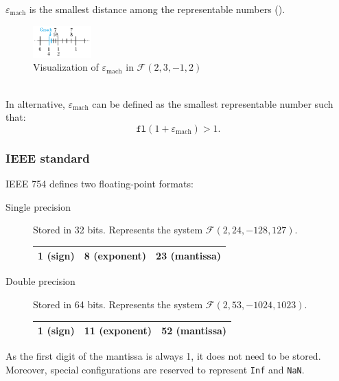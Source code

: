 $\varepsilon_{\text{mach}}$ is the smallest distance among the representable numbers ().
\begin{figure}[h]
    \centering
    \includegraphics[width=0.2\textwidth]{img/machine_eps.png}
    \caption{Visualization of $\varepsilon_{\text{mach}}$ in $\mathcal{F}(2, 3, -1, 2)$}
    \label{fig:finnum_eps}
\end{figure}\\
%
In alternative, $\varepsilon_{\text{mach}}$ can be defined as the smallest representable number such that:
\begin{equation*}
    \texttt{fl}(1 + \varepsilon_{\text{mach}}) > 1.
\end{equation*}


\subsubsection{IEEE standard}
IEEE 754 defines two floating-point formats:
\begin{description}
    \item[Single precision] Stored in 32 bits. Represents the system $\mathcal{F}(2, 24, -128, 127)$. 
        \begin{center}
            \small
            \begin{tabular}{|c|c|c|}
                \hline
                1 (sign) & 8 (exponent) & 23 (mantissa) \\
                \hline
            \end{tabular}
        \end{center}

    \item[Double precision] Stored in 64 bits. Represents the system $\mathcal{F}(2, 53, -1024, 1023)$. 
        \begin{center}
            \small
            \begin{tabular}{|c|c|c|}
                \hline
                1 (sign) & 11 (exponent) & 52 (mantissa) \\
                \hline
            \end{tabular}
        \end{center}
\end{description}
As the first digit of the mantissa is always 1, it does not need to be stored.
Moreover, special configurations are reserved to represent \texttt{Inf} and \texttt{NaN}.


